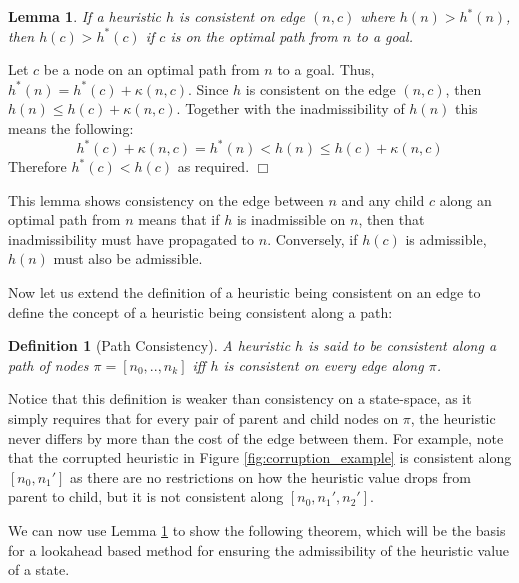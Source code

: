 \documentclass[letterpaper]{article}
\newtheorem{lemma}{Lemma}
\newtheorem{definition}{Definition}
\newenvironment{proof}{\par\noindent{\em Proof.}}{\hfill $\Box$\medskip}
\begin{document}
\begin{lemma}%
\label{lemma:inad_corruption}
If a heuristic $h$ is consistent on edge $(n, c)$ where $h(n)>h^*(n)$, then $h(c) > h^*(c)$ if $c$ is on the optimal path from $n$ to a goal. 
\label{lem:inadmissible-corruption}
\end{lemma}
\begin{proof}
Let $c$ be a node on an optimal path from $n$ to a goal.
Thus, $h^*(n)=h^*(c)+\kappa (n,c)$. Since $h$ is consistent on the edge $(n, c)$, then $h(n)\leq h(c)+\kappa(n,c)$. Together with the inadmissibility of $h(n)$ this means the following:
\[ h^*(c)+\kappa(n,c)= h^*(n) < h(n) \leq h(c)+\kappa(n,c) \]
Therefore $h^*(c)<h(c)$ as required.
\end{proof}


This lemma shows consistency on the edge between $n$ and any child $c$ along an optimal path from $n$ means that if $h$ is inadmissible on $n$, then that inadmissibility must have propagated to $n$. Conversely, if $h(c)$ is admissible, $h(n)$ must also be admissible.

Now let us extend the definition of a heuristic being consistent on an edge to define the concept of a heuristic being consistent along a path:

\begin{definition}[Path Consistency]
A heuristic $h$ is said to be consistent along a path of nodes $\pi=[n_0,..,n_k]$ iff $h$ is consistent on every edge along $\pi$. 
\end{definition}
Notice that this definition is weaker than consistency on a state-space, as it simply requires that for every pair of parent and child nodes on $\pi$, the heuristic never differs by more than the cost of the edge between them.
For example, note that the corrupted heuristic in Figure \ref{fig:corruption_example} is consistent along $[n_0, n_1']$ as there are no restrictions on how the heuristic value drops from parent to child, but it is not consistent along $[n_0, n_1', n_2']$.

We can now use Lemma \ref{lemma:inad_corruption} to show the following theorem, which will be the basis for a lookahead based method for ensuring the admissibility of the heuristic value of a state.

\end{document}

